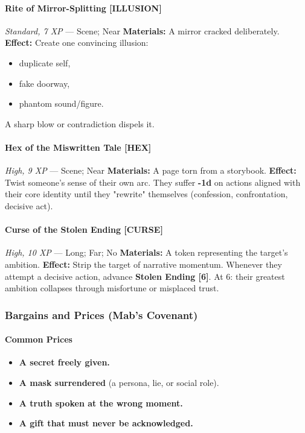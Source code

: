\documentclass[11pt]{book}
\begin{document}
\paragraph{Rite of Mirror-Splitting [ILLUSION]}
\emph{Standard, 7 XP} --- Scene; Near  
\textbf{Materials:} A mirror cracked deliberately.  
\textbf{Effect:} Create one convincing illusion:
\begin{itemize}[leftmargin=*]
    \item duplicate self,  
    \item fake doorway,  
    \item phantom sound/figure.
\end{itemize}
A sharp blow or contradiction dispels it.

\paragraph{Hex of the Miswritten Tale [HEX]}
\emph{High, 9 XP} --- Scene; Near  
\textbf{Materials:} A page torn from a storybook.  
\textbf{Effect:} Twist someone's sense of their own arc.  
They suffer \textbf{-1d} on actions aligned with their core identity until they "rewrite" themselves (confession, confrontation, decisive act).

\paragraph{Curse of the Stolen Ending [CURSE]}
\emph{High, 10 XP} --- Long; Far; No  
\textbf{Materials:} A token representing the target's ambition.  
\textbf{Effect:} Strip the target of narrative momentum.  
Whenever they attempt a decisive action, advance \textbf{Stolen Ending [6]}.  
At 6: their greatest ambition collapses through misfortune or misplaced trust.

\subsubsection{Bargains and Prices (Mab's Covenant)}

\paragraph{Common Prices}
\begin{itemize}[leftmargin=*]
    \item \textbf{A secret freely given.}
    \item \textbf{A mask surrendered} (a persona, lie, or social role).
    \item \textbf{A truth spoken at the wrong moment.}
    \item \textbf{A gift that must never be acknowledged.}
\end{itemize}
\end{document}
